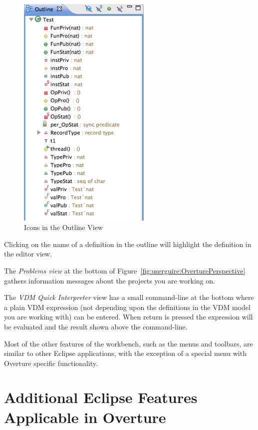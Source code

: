 \documentclass{overturerepchap}
\begin{document}
\begin{figure}[!htb]
\begin{center}
  \includegraphics[width=2.5in]{figures/OutlineIcons}
  \caption[labelInTOC]{Icons in the Outline View}
  \label{fig:OutlineIcons}
\end{center}
\end{figure}

Clicking on the name of a definition in the outline will highlight the
definition in the editor view.

The \emph{Problems view} at the bottom of 
Figure~\ref{fig:userguire:OverturePerspective} gathers 
information messages about the projects you are
working on.

The \emph{VDM Quick Interpreter}
view has a small command-line at the bottom where a plain VDM expression
(not depending upon the definitions in the VDM model you are working with) can be
entered. When return is pressed the expression will be evaluated and
the result shown above the command-line.

Most of the other features of the workbench, such as the menus and
toolbars, are similar to other Eclipse applications, with the exception 
of a special menu with Overture specific functionality.

\section{Additional Eclipse Features Applicable in Overture}
\end{document}
